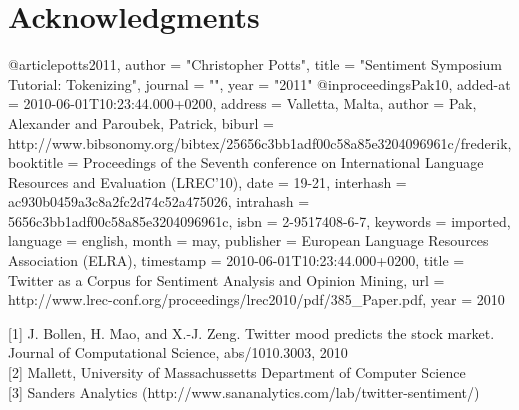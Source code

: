 \documentclass[letterpaper]{article}
\begin{document}
\section{ Acknowledgments}

\begin{thebibliography}{99}
@article{potts2011,
    author    = "Christopher Potts",
    title     = "Sentiment Symposium Tutorial: Tokenizing",
    journal   = "",
    year      = "2011"
}
@inproceedings{Pak10,
  added-at = {2010-06-01T10:23:44.000+0200},
  address = {Valletta, Malta},
  author = {Pak, Alexander and Paroubek, Patrick},
  biburl = {http://www.bibsonomy.org/bibtex/25656c3bb1adf00c58a85e3204096961c/frederik},
  booktitle = {Proceedings of the Seventh conference on International Language Resources and Evaluation (LREC'10)},
  date = {19-21},
  interhash = {ac930b0459a3c8a2fc2d74c52a475026},
  intrahash = {5656c3bb1adf00c58a85e3204096961c},
  isbn = {2-9517408-6-7},
  keywords = {imported},
  language = {english},
  month = may,
  publisher = {European Language Resources Association (ELRA)},
  timestamp = {2010-06-01T10:23:44.000+0200},
  title = {Twitter as a Corpus for Sentiment Analysis and Opinion Mining},
  url = {http://www.lrec-conf.org/proceedings/lrec2010/pdf/385_Paper.pdf},
  year = 2010
}
\end{thebibliography}

[1] J. Bollen, H. Mao, and X.-J. Zeng. Twitter mood predicts the
stock market. Journal of Computational Science,
abs/1010.3003, 2010\\

[2] Mallett, University of Massachussetts Department of Computer Science\\

[3] Sanders Analytics (http://www.sananalytics.com/lab/twitter-sentiment/)
\end{document}
